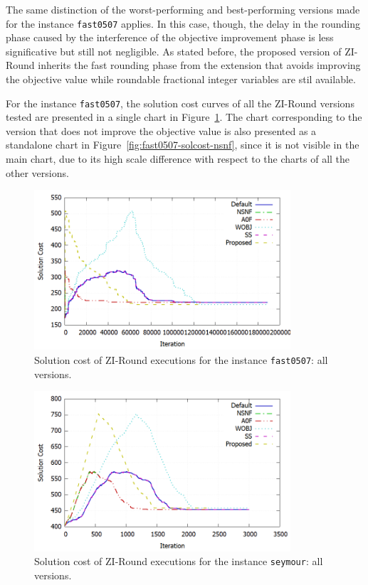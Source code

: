 \documentclass[a4paper,12pt]{book}
\begin{document}
The same distinction of the worst-performing and best-performing versions made for the instance \texttt{fast0507} applies. In this case, though, the delay in the rounding phase caused by the interference of the objective improvement phase is less significative but still not negligible. As stated before, the proposed version of ZI-Round inherits the fast rounding phase from the extension that avoids improving the objective value while roundable fractional integer variables are stil available. \par

For the instance \texttt{fast0507}, the solution cost curves of all the ZI-Round versions tested are presented in a single chart in Figure~\ref{fig:fast0507-solcost-all}. The chart corresponding to the version that does not improve the objective value is also presented as a standalone chart in Figure~\ref{fig:fast0507-solcost-nsnf}, since it is not visible in the main chart, due to its high scale difference with respect to the charts of all the other versions.

\begin{figure}[ht]
	\centering
	\includegraphics[width=0.85\textwidth]{fast0507-solcost-all.png}
	\caption{Solution cost of ZI-Round executions for the instance \texttt{fast0507}: all versions.}
	\label{fig:fast0507-solcost-all}
\end{figure}

\begin{figure}[h!]
	\centering
	\includegraphics[width=0.85\textwidth]{seymour-solcost-all.png}
	\caption{Solution cost of ZI-Round executions for the instance \texttt{seymour}: all versions.}
	\label{fig:seymour-solcost-all}
\end{figure}
\end{document}
